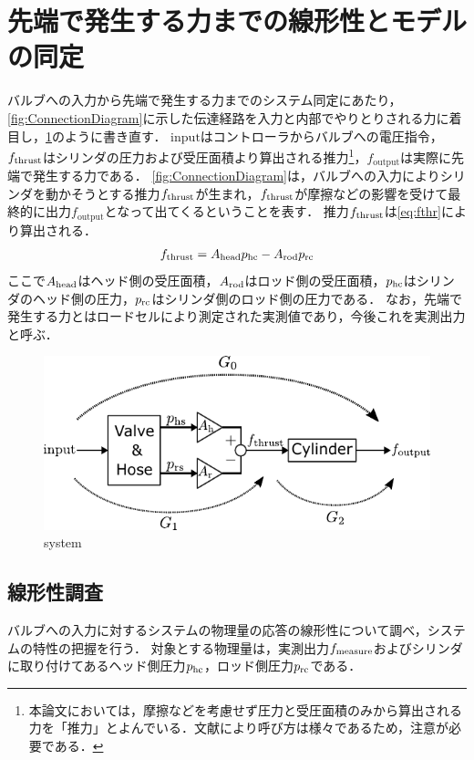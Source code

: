 \section{先端で発生する力までの線形性とモデルの同定}
\label{sec:力までの同定}
バルブへの入力から先端で発生する力までのシステム同定にあたり，\figname\ref{fig:ConnectionDiagram}に示した伝達経路を入力と内部でやりとりされる力に着目し，\figname\ref{fig:system_dentatsu}のように書き直す．
$\mathrm{input}$はコントローラからバルブへの電圧指令，$f_\mathrm{thrust}$はシリンダの圧力および受圧面積より算出される推力\footnote{本論文においては，摩擦などを考慮せず圧力と受圧面積のみから算出される力を「推力」とよんでいる．文献により呼び方は様々であるため，注意が必要である．}，$f_\mathrm{output}$は実際に先端で発生する力である．
\figname\ref{fig:ConnectionDiagram}は，バルブへの入力によりシリンダを動かそうとする推力$f_\mathrm{thrust}$が生まれ，$f_\mathrm{thrust}$が摩擦などの影響を受けて最終的に出力$f_\mathrm{output}$となって出てくるということを表す．
推力$f_\mathrm{thrust}$は\eqnname\eqref{eq:fthr}により算出される．
\begin{align}
    \label{eq:fthr}
    f_\mathrm{thrust} = A_\mathrm{head}  p_\mathrm{hc} - A_\mathrm{rod} p_\mathrm{rc}
\end{align}
ここで$A_\mathrm{head}$はヘッド側の受圧面積，$A_\mathrm{rod}$はロッド側の受圧面積，$p_\mathrm{hc}$はシリンダのヘッド側の圧力，$p_\mathrm{rc}$はシリンダ側のロッド側の圧力である．
なお，先端で発生する力とはロードセルにより測定された実測値であり，今後これを実測出力と呼ぶ．
\begin{figure}[t]
    \centering
        \includegraphics[keepaspectratio, scale=1.0]{contents/SystemIdentification/figure/system_dentatsu.pdf}
        \caption{system}
        \label{fig:system_dentatsu}
\end{figure}

\subsection{線形性調査}
\label{sec:線形性調査(力)}
バルブへの入力に対するシステムの物理量の応答の線形性について調べ，システムの特性の把握を行う．
対象とする物理量は，実測出力$f_\mathrm{measure}$およびシリンダに取り付けてあるヘッド側圧力$p_\mathrm{hc}$，ロッド側圧力$p_\mathrm{rc}$である．

